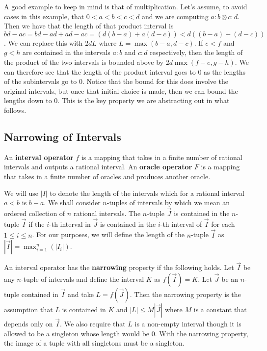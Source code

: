 \documentclass[12pt]{article}
\theoremstyle{remark}
\begin{document}
A good example to keep in mind is that of multiplication. Let's assume, to avoid cases in this example, that  $0 < a < b < c < d$ and we are computing $a:b \otimes c:d$. Then we have that the length of that product interval is $bd-ac = bd-ad+ad - ac= (d(b-a) + a(d-c))< d ( ( b-a) + (d-c) )$. We can replace this with $2dL$ where $L = \max(b-a, d-c)$. If $e<f$ and $g<h$ are contained in the intervals $a:b$ and $c:d$ respectively, then the length of the product of the two intervals is bounded above by $2d\max(f-e, g-h)$. We can therefore see that the length of the product interval goes to 0 as the lengths of the subintervals go to 0. Notice that the bound for this does involve the original intervals, but once that initial choice is made, then we can bound the lengths down to 0. This is the key property we are abstracting out in what follows. 

\subsection{Narrowing of Intervals}

An \textbf{interval operator} $f$ is a mapping that takes in a finite number of rational intervals and outputs a rational interval. An \textbf{oracle operator} $F$ is a mapping that takes in a finite number of oracles and produces another oracle.

We will use $|I|$ to denote the length of the intervals which for a rational interval $a<b$ is $b-a$. We shall consider $n$-tuples of intervals by which we mean an ordered collection of $n$ rational intervals. The $n$-tuple $\vec{J}$ is contained in the $n$-tuple $\vec{I}$ if the $i$-th interval in $\vec{J}$ is contained in the $i$-th interval of $\vec{I}$ for each $1 \leq i \leq n$. For our purposes, we will define the length of the $n$-tuple $\vec{I}$ as $|\vec{I}| = \max_{i=1}^n (|I_i|)$.

An interval operator has the \textbf{narrowing} property if the following holds. Let $\vec{I}$ be any $n$-tuple of intervals and define the interval $K$ as $f(\vec{I}) = K$. Let $\vec{J}$ be an $n$-tuple contained in $\vec{I}$ and take $L= f(\vec{J})$. Then the narrowing property is the assumption that $L$ is contained in $K$ and $|L| \leq M |\vec{J}|$ where $M$ is a constant that depends only on $\vec{I}$. We also require that $L$ is a non-empty interval though it is allowed to be a singleton whose length would be 0. With the narrowing property, the image of a tuple with all singletons must be a singleton. 
\end{document}
